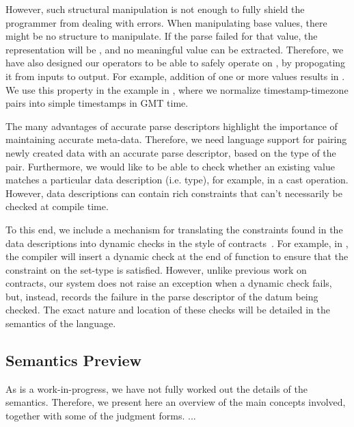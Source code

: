 \documentclass{entcs}
\begin{document}
However, such structural manipulation is not enough to fully shield
the programmer from dealing with errors. When manipulating base
values, there might be no structure to manipulate. If the parse failed
for that value, the representation will be \bottom{}, and no
meaningful value can be extracted. Therefore, we have also designed
our operators to be able to safely operate on \bottom{}, by
propogating it from inputs to output. For example, addition of one or
more \bottom{} values results in \bottom{}. We use this property in
the example in , where we normalize
timestamp-timezone pairs into simple timestamps in GMT time.

The many advantages of accurate parse descriptors highlight the
importance of maintaining accurate meta-data. Therefore, we need
language support for pairing newly created data with an accurate parse
descriptor, based on the type of the pair. Furthermore, we would like
to be able to check whether an existing value matches a particular
data description (i.e. type), for example, in a cast operation.
However, data descriptions can contain rich constraints that can't
necessarily be checked at compile time.

To this end, we include a mechanism for translating the constraints
found in the data descriptions into dynamic checks in the style of
contracts~\cite{contracts}. For example, in
, the compiler will insert a dynamic check
at the end of function  to ensure that the constraint
on the set-type is satisfied. However, unlike previous work on
contracts, our system does not raise an exception when a dynamic check
fails, but, instead, records the failure in the parse descriptor of
the datum being checked.  The exact nature and location of these
checks will be detailed in the semantics of the language.

\subsection{Semantics Preview}

As \datatype{} is a work-in-progress, we have not fully worked out the
details of the semantics.  Therefore, we present here an overview of
the main concepts involved, together with some of the judgment forms.
...

\end{document}
